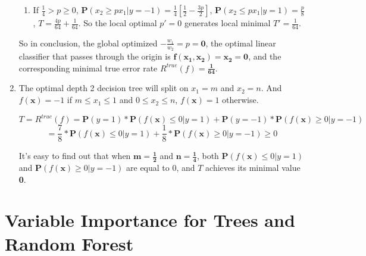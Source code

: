\documentclass[paper=letter, fontsize=12pt]{article}
\begin{document}
\begin{enumerate}[label=(\alph*)]
\begin{enumerate}[label=(\roman*)]
		\item If $\frac{1}{4} > p \geq 0$, $\mathbf{P}(x_2 \geq p x_1 | y = -1) = \frac{1}{4}[\frac{1}{2} - 
		\frac{3p}{2}]$, $\mathbf{P}(x_2 \leq p x_1 | y = 1) = \frac{p}{8}$, $T = \frac{4p}{64} + \frac{1}{64}$. So the local optimal $p' = 0 $ generates local minimal $T' = \frac{1}{64}$.
	\end{enumerate}

	So in conclusion, the global optimized $-\frac{w_1}{w_2} = p = \mathbf{0}$, the optimal linear classifier that passes through the origin is $\mathbf{f(x_1, x_2) = x_2 = 0}$, and the corresponding minimal true error rate $R^{true}(f) = \mathbf{\frac{1}{64}}$.
	
	\item The optimal depth 2 decision tree will split on $x_1 = m$ and $x_2 = n$. And $f(\mathbf{x}) = -1$ if $m \leq x_1 \leq 1$ and $0 \leq x_2 \leq n$, $f(\mathbf{x}) = 1$ otherwise.
	
	\begin{equation}
	T = R^{true}(f) = \mathbf{P}(y = 1) * \mathbf{P}(f(\mathbf{x}) \leq 0 | y = 1) + \mathbf{P}(y = -1) * \mathbf{P}(f(\mathbf{x}) \geq 0 | y = -1)
	\end{equation}
	\begin{equation}
	= \frac{7}{8} * \mathbf{P}(f(\mathbf{x}) \leq 0 | y = 1) + \frac{1}{8} * \mathbf{P}(f(\mathbf{x}) \geq 0 | y = -1) \geq 0
	\end{equation}
	
	It's easy to find out that when $\mathbf{m = \frac{1}{2}}$ and $\mathbf{n = \frac{1}{4}}$, both $\mathbf{P}(f(\mathbf{x}) \leq 0 | y = 1)$ and $\mathbf{P}(f(\mathbf{x}) \geq 0 | y = -1) $ are equal to 0, and $T$ achieves its minimal value \textbf{0}.
	
\end{enumerate}

\section{Variable Importance for Trees and Random Forest}
\end{document}
